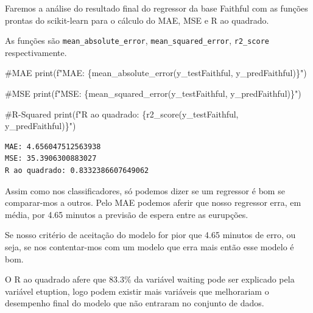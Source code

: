 \documentclass[
  letterpaper,
  DIV=11,
  numbers=noendperiod]{scrreprt}
\newenvironment{Shaded}{\begin{snugshade}}{\end{snugshade}}
\newcommand{\BuiltInTok}[1]{\textcolor[rgb]{0.00,0.23,0.31}{#1}}
\newcommand{\CommentTok}[1]{\textcolor[rgb]{0.37,0.37,0.37}{#1}}
\newcommand{\NormalTok}[1]{\textcolor[rgb]{0.00,0.23,0.31}{#1}}
\newcommand{\SpecialCharTok}[1]{\textcolor[rgb]{0.37,0.37,0.37}{#1}}
\newcommand{\SpecialStringTok}[1]{\textcolor[rgb]{0.13,0.47,0.30}{#1}}
\begin{document}
Faremos a análise do resultado final do regressor da base Faithful com
as funções prontas do scikit-learn para o cálculo do MAE, MSE e R ao
quadrado.

As funções são \texttt{mean\_absolute\_error},
\texttt{mean\_squared\_error}, \texttt{r2\_score} respectivamente.

\begin{Shaded}
\begin{Highlighting}[]
\CommentTok{\#MAE}
\BuiltInTok{print}\NormalTok{(}\SpecialStringTok{f"MAE: }\SpecialCharTok{\{}\NormalTok{mean\_absolute\_error(y\_testFaithful, y\_predFaithful)}\SpecialCharTok{\}}\SpecialStringTok{"}\NormalTok{)}

\CommentTok{\#MSE}
\BuiltInTok{print}\NormalTok{(}\SpecialStringTok{f"MSE: }\SpecialCharTok{\{}\NormalTok{mean\_squared\_error(y\_testFaithful, y\_predFaithful)}\SpecialCharTok{\}}\SpecialStringTok{"}\NormalTok{)}

\CommentTok{\#R{-}Squared}
\BuiltInTok{print}\NormalTok{(}\SpecialStringTok{f"R ao quadrado: }\SpecialCharTok{\{}\NormalTok{r2\_score(y\_testFaithful, y\_predFaithful)}\SpecialCharTok{\}}\SpecialStringTok{"}\NormalTok{)}
\end{Highlighting}
\end{Shaded}

\begin{verbatim}
MAE: 4.656047512563938
MSE: 35.3906300883027
R ao quadrado: 0.8332386607649062
\end{verbatim}

Assim como nos classificadores, só podemos dizer se um regressor é bom
se comparar-mos a outros. Pelo MAE podemos aferir que nosso regressor
erra, em média, por 4.65 minutos a previsão de espera entre as
eurupções.

Se nosso critério de aceitação do modelo for pior que 4.65 minutos de
erro, ou seja, se nos contentar-mos com um modelo que erra mais então
esse modelo é bom.

O R ao quadrado afere que 83.3\% da variável waiting pode ser explicado
pela variável etuption, logo podem existir mais variáveis que
melhorariam o desempenho final do modelo que não entraram no conjunto de
dados.
\end{document}
